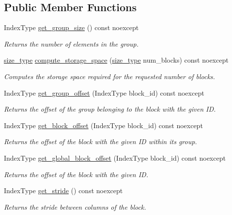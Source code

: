 \subsection*{Public Member Functions}
\begin{DoxyCompactItemize}
\item 
Index\+Type \hyperlink{structgko_1_1preconditioner_1_1block__interleaved__storage__scheme_af5eee19f00b1cd4c378ac3410be72093}{get\+\_\+group\+\_\+size} () const noexcept
\begin{DoxyCompactList}\small\item\em Returns the number of elements in the group. \end{DoxyCompactList}\item 
\hyperlink{namespacegko_a6e5c95df0ae4e47aab2f604a22d98ee7}{size\+\_\+type} \hyperlink{structgko_1_1preconditioner_1_1block__interleaved__storage__scheme_ae46b38432c1e1b87d5743a649f2cfe84}{compute\+\_\+storage\+\_\+space} (\hyperlink{namespacegko_a6e5c95df0ae4e47aab2f604a22d98ee7}{size\+\_\+type} num\+\_\+blocks) const noexcept
\begin{DoxyCompactList}\small\item\em Computes the storage space required for the requested number of blocks. \end{DoxyCompactList}\item 
Index\+Type \hyperlink{structgko_1_1preconditioner_1_1block__interleaved__storage__scheme_a66a04b4dc90547fde872359c78ee22a4}{get\+\_\+group\+\_\+offset} (Index\+Type block\+\_\+id) const noexcept
\begin{DoxyCompactList}\small\item\em Returns the offset of the group belonging to the block with the given ID. \end{DoxyCompactList}\item 
Index\+Type \hyperlink{structgko_1_1preconditioner_1_1block__interleaved__storage__scheme_a6384280dc1ad46fc1589d0b9165fd022}{get\+\_\+block\+\_\+offset} (Index\+Type block\+\_\+id) const noexcept
\begin{DoxyCompactList}\small\item\em Returns the offset of the block with the given ID within its group. \end{DoxyCompactList}\item 
Index\+Type \hyperlink{structgko_1_1preconditioner_1_1block__interleaved__storage__scheme_ad8356b187814609c7d77bd03e025c48f}{get\+\_\+global\+\_\+block\+\_\+offset} (Index\+Type block\+\_\+id) const noexcept
\begin{DoxyCompactList}\small\item\em Returns the offset of the block with the given ID. \end{DoxyCompactList}\item 
Index\+Type \hyperlink{structgko_1_1preconditioner_1_1block__interleaved__storage__scheme_aa07119fbf99fae71b1f9c4f693e14ce4}{get\+\_\+stride} () const noexcept
\begin{DoxyCompactList}\small\item\em Returns the stride between columns of the block. \end{DoxyCompactList}\end{DoxyCompactItemize}
